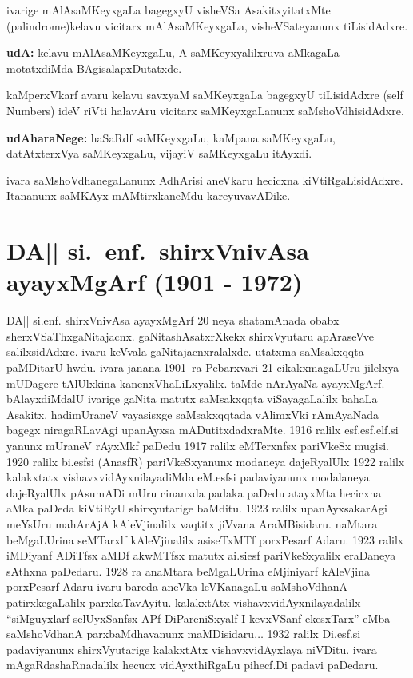 ivarige mAlAsaMKeyxgaLa bagegxyU visheVSa AsakitxyitatxMte {\rm (palindrome)}\;kelavu vicitarx mAlAsaMKeyxgaLa, visheVSateyanunx tiLisidAdxre.

\textbf{udA:} kelavu mAlAsaMKeyxgaLu, A saMKeyxyalilxruva aMkagaLa motatxdiMda BAgisalapx\-Dutatxde.

kaMperxVkarf avaru kelavu savxyaM saMKeyxgaLa bagegxyU tiLisidAdxre {\rm (self Numbers)}
 ideV riVti halavAru vicitarx saMKeyxgaLanunx saMshoVdhisidAdxre. 

\textbf{udAharaNege:} haSaRdf saMKeyxgaLu, kaMpana saMKeyxgaLu, datAtxterxVya saMKeyxgaLu, vijayiV saMKeyxgaLu itAyxdi.

ivara saMshoVdhanegaLanunx AdhArisi aneVkaru hecicxna kiVtiRgaLisidAdxre. Itananunx saMKAyx mAMtirxkaneMdu kareyuvavADike.

\section{{\protect\bf DA|| si.~enf.\ shirxVnivAsa ayayxMgArf {\rm (1901 - 1972)}}}

DA|| si.enf. shirxVnivAsa ayayxMgArf {\rm 20} neya shatamAnada obabx sherxVSaThxgaNitajacnx. gaNita\-shAsatxrXkekx shirxVyutaru apAraseVve salilxsidAdxre. ivaru keVvala gaNitajacnxralalxde. utatxma saMsakxqqta paMDitarU hwdu. ivara janana {\rm 1901}~ra Pebarxvari {\rm 21} cikakxmagaLUru jilelxya mUDagere tAlUlxkina kanenxVhaLiLxyalilx. taMde nArAyaNa ayayxMgArf. bAlayx\-diMdalU ivarige gaNita matutx saMsakxqqta viSayagaLalilx bahaLa Asakitx. hadimUraneV vayasisxge saMsakxqq\-tada vAlimxVki rAmAyaNada bagegx niragaRLavAgi upanAyxsa mADutitxdadxraMte. {\rm 1916} ralilx esf.esf.elf.si yanunx mUraneV rAyxMkf paDedu {\rm 1917} ralilx eMTerxnfsx pariVkeSx mugisi. {\rm 1920} ralilx bi.esfsi (AnasfR) pariVkeSxyanunx modaneya dajeRyalUlx {\rm 1922} ralilx kalakxtatx vishavxvidAyxnilayadiMda eM.esfsi padaviyanunx modalaneya dajeRyalUlx pAsumADi mUru cinanxda padaka paDedu atayxMta hecicxna aMka paDeda kiVtiRyU shirxyutarige baMditu. {\rm 1923} ralilx upanAyxsakarAgi meYsUru mahArAjA kAleVjinalilx vaqtitx jiVvana AraMBisidaru. naMtara beMgaLUrina seMTarxlf kAleVjinalilx asiseTxMTf porxPesarf Adaru. {\rm 1923} ralilx iMDiyanf ADiTfsx aMDf akwMTfsx matutx ai.siesf pariVkeSxyalilx eraDaneya sAthxna paDedaru. {\rm 1928} ra anaMtara beMgaLUrina eMjiniyarf kAleVjina porxPesarf Adaru ivaru bareda aneVka leVKanagaLu saMshoVdhanA patirxkegaLalilx parxkaTavAyitu. kalakxtAtx vishavxvidAyxnilayadalilx ``siMguyxlarf selUyxSanfsx APf DiPareniSxyalf I kevxVSanf ekesxTarx'' eMba saMshoVdhanA parxbaMdhavanunx maMDisidaru$\ldots$ {\rm 1932} ralilx Di.esf.si padaviyanunx shirxVyutarige kalakxtAtx vishavxvidAyxlaya niVDitu. ivara mAgaRdashaRnadalilx hecucx vidAyxthiRgaLu pihecf.Di padavi paDedaru.

